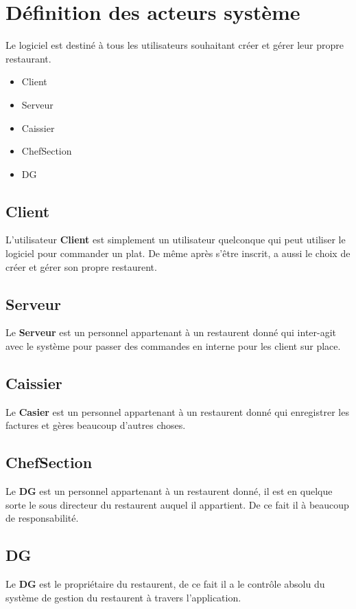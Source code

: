 \section{Définition des acteurs système}
Le logiciel est destiné à tous les utilisateurs souhaitant créer et gérer leur propre restaurant.
\begin{itemize}
    \item Client
    \item Serveur 
    \item Caissier
    \item ChefSection
    \item DG 
\end{itemize}
\subsection{Client}
L'utilisateur \textbf{Client} est simplement un utilisateur quelconque qui peut utiliser le logiciel pour commander un plat.
De même après s'être inscrit, a aussi le choix de créer et gérer son propre restaurent.
\subsection{Serveur}
Le \textbf{Serveur} est un personnel appartenant à un restaurent donné qui inter-agit avec le système pour passer des commandes en interne pour les client sur place.

\subsection{Caissier }
Le \textbf{Casier} est un personnel appartenant à un restaurent donné qui enregistrer les factures et gères beaucoup d'autres choses.

\subsection{ChefSection}
Le \textbf{DG} est un personnel appartenant à un restaurent donné, il est en quelque sorte le sous directeur du restaurent auquel il appartient. De ce fait il à beaucoup de responsabilité.

\subsection{DG}
Le \textbf{DG} est le propriétaire du restaurent, de ce fait il a le contrôle absolu du système de gestion du restaurent à travers l'application.

